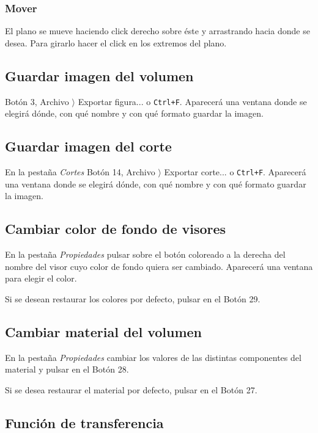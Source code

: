 \subsubsection{Mover}

El plano se mueve haciendo click derecho sobre éste y arrastrando hacia donde se desea. Para girarlo hacer el click en los extremos del plano.

\subsection{Guardar imagen del volumen}

Botón 3, Archivo $ \rangle $ Exportar figura... o \texttt{Ctrl+F}. Aparecerá una ventana donde se elegirá dónde, con qué nombre y con qué formato guardar la imagen.

\subsection{Guardar imagen del corte}

En la pestaña \textit{Cortes} Botón 14, Archivo $ \rangle $ Exportar corte... o \texttt{Ctrl+F}. Aparecerá una ventana donde se elegirá dónde, con qué nombre y con qué formato guardar la imagen.
 
\subsection{Cambiar color de fondo de visores}

En la pestaña \textit{Propiedades} pulsar sobre el botón coloreado a la derecha del nombre del visor cuyo color de fondo quiera ser cambiado. Aparecerá una ventana para elegir el color.

Si se desean restaurar los colores por defecto, pulsar en el Botón 29.

\subsection{Cambiar material del volumen}

En la pestaña \textit{Propiedades} cambiar los valores de las distintas componentes del material y pulsar en el Botón 28.

Si se desea restaurar el material por defecto, pulsar en el Botón 27.

\subsection{Función de transferencia}

